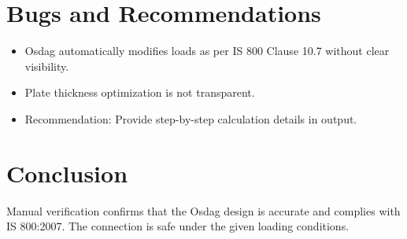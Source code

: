 \section{Bugs and Recommendations}
\begin{itemize}
    \item Osdag automatically modifies loads as per IS 800 Clause 10.7 without clear visibility.
    \item Plate thickness optimization is not transparent.
    \item Recommendation: Provide step-by-step calculation details in output.
\end{itemize}

\section{Conclusion}
Manual verification confirms that the Osdag design is accurate and complies with IS 800:2007. The connection is safe under the given loading conditions.

